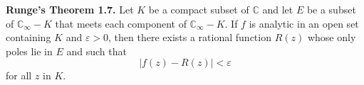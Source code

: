 \textbf{Runge's Theorem 1.7.} Let $K$ be a compact subset of $\mathbb{C}$ and let $E$ be a subset of $\mathbb{C}_\infty - K$ that meets each component of $\mathbb{C}_\infty - K$. If $f$ is analytic in an open set containing $K$ and $\varepsilon > 0$, then there exists a rational function $R(z)$ whose only poles lie in $E$ and such that
$$|f(z) - R(z)| < \varepsilon$$
for all $z$ in $K$.
